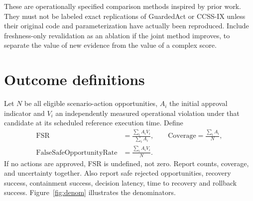 ﻿\documentclass[sigconf,nonacm]{acmart}
\begin{document}
These are operationally specified comparison methods inspired by prior work. They must not be labeled exact replications of GuardedAct or CCSS-IX unless their original code and parameterization have actually been reproduced. Include freshness-only revalidation as an ablation if the joint method improves, to separate the value of new evidence from the value of a complex score.

\section{Outcome definitions}\label{sec:outcome}
Let $N$ be all eligible scenario-action opportunities, $A_i$ the initial approval indicator and $V_i$ an independently measured operational violation under that candidate at its scheduled reference execution time. Define
\[
\begin{aligned}\mathrm{FSR}&=\frac{\sum_i A_i V_i}{\sum_i A_i},\qquad \mathrm{Coverage}=\frac{\sum_i A_i}{N},\\
\mathrm{FalseSafeOpportunityRate}&=\frac{\sum_i A_i V_i}{N}.\end{aligned}
\]
If no actions are approved, FSR is undefined, not zero. Report counts, coverage, and uncertainty together. Also report safe rejected opportunities, recovery success, containment success, decision latency, time to recovery and rollback success. Figure~\ref{fig:denom} illustrates the denominators.
\end{document}
